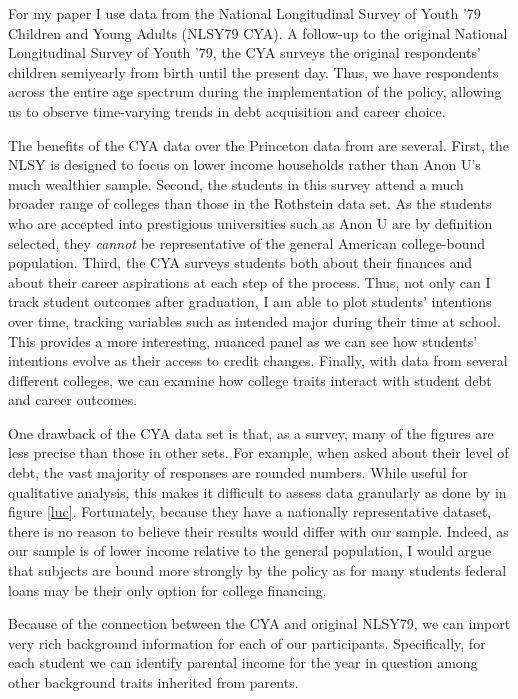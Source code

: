 \documentclass{article}
\begin{document}
	For my paper I use data from the National Longitudinal Survey of Youth '79 Children and Young Adults (NLSY79 CYA). A follow-up to the original National Longitudinal Survey of Youth '79, the CYA surveys the original respondents' children semiyearly from birth until the present day. Thus, we have respondents across the entire age spectrum during the implementation of the policy, allowing us to observe time-varying trends in debt acquisition and career choice. 
	
	The benefits of the CYA data over the Princeton data from \textcite{rothstein2011} are several. First, the NLSY is designed to focus on lower income households rather than Anon U's much wealthier sample. Second, the students in this survey attend a much broader range of colleges than those in the Rothstein data set. As the students who are accepted into prestigious universities such as Anon U are by definition selected, they \emph{cannot} be representative of the general American college-bound population. Third, the CYA surveys students both about their finances and about their career aspirations at each step of the process. Thus, not only can I track student outcomes after graduation, I am able to plot students' intentions over time, tracking variables such as intended major during their time at school. This provides a more interesting, nuanced panel as we can see how students' intentions evolve as their access to credit changes. Finally, with data from several different colleges, we can examine how college traits interact with student debt and career outcomes. 
	
	One drawback of the CYA data set is that, as a survey, many of the figures are less precise than those in other sets. For example, when asked about their level of debt, the vast majority of responses are rounded numbers. While useful for qualitative analysis, this makes it difficult to assess data granularly as done by \textcite{lucca2018} in figure \ref{luc}. Fortunately, because they have a nationally representative dataset, there is no reason to believe their results would differ with our sample. Indeed, as our sample is of lower income relative to the general population, I would argue that subjects are bound more strongly by the policy as for many students federal loans may be their only option for college financing.
	
	Because of the connection between the CYA and original NLSY79, we can import very rich background information for each of our participants. Specifically, for each student we can identify parental income for the year in question among other background traits inherited from parents.
	
\end{document}
